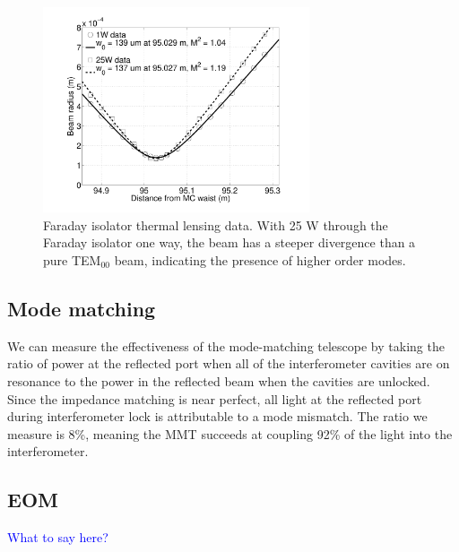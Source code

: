 \begin{figure}
\begin{centering}
\includegraphics[width=0.7\textwidth]{figures/REFL_datafit.pdf}
\caption{Faraday isolator thermal lensing data. With 25 W through the
  Faraday isolator one way, the beam has a steeper divergence than a
  pure TEM$_{00}$ beam, indicating the presence of higher order modes.}
\label{fig:lensing}
\end{centering}
\end{figure}

\subsection{Mode matching}
We can measure the effectiveness of the mode-matching telescope by
taking the ratio of power at the reflected port when all of the
interferometer cavities are on resonance to the power in the reflected
beam when the cavities are unlocked. Since the impedance matching is near perfect,
all light at the reflected port during interferometer lock is
attributable to a mode mismatch. The ratio we measure is 8\%, meaning
the MMT succeeds at coupling 92\% of the light into the
interferometer. 

\subsection{EOM}
\textcolor{blue}{What to say here?}




